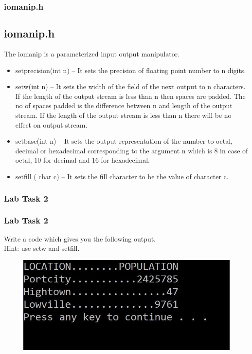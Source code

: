 \documentclass{beamer}
\begin{document}
\begin{frame}[label=iomanip.h]
	\frametitle{iomanip.h}
	\subsection{iomanip.h}
	The iomanip is a parameterized input output manipulator.
	\begin{itemize}
	\item setprecision(int n) – It sets the precision of floating point number to n digits.
		\item setw(int n) – It sets the width of the field of the next output to n characters. If the length of the output stream is less than n then spaces are padded. The no of spaces padded is the difference between n and length of the output stream. If the length of the output stream is less than n there will be no effect on output stream.
 	\item setbase(int n) – It sets the output representation of the number to octal, decimal or hexadecimal corresponding to the argument n which is 8 in case of octal, 10 for decimal and 16 for hexadecimal.
	\item setfill ( char c) – It sets the fill character to be the value of character c.
	
	\end{itemize}
\end{frame}

\begin{frame}[label=lt2]
	\frametitle{Lab Task 2}
	\subsubsection{Lab Task 2}
	Write a code which gives you the following output.\\
	Hint: use setw and setfill.
	\begin{figure}
            \centering
            \includegraphics[scale=0.7]{Task2}
    \end{figure}
    \hyperlink{ltcode}{}
\end{frame}
\end{document}
